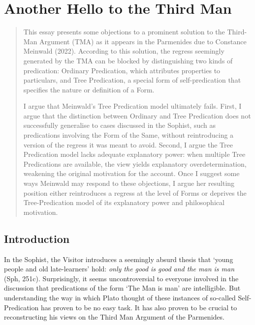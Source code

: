 \chapter{Another Hello to the Third Man}

\begin{quote}
    This essay presents some objections to a prominent solution to the Third-Man Argument (TMA) as it appears in the Parmenides due to Constance Meinwald (2022). According to this solution, the regress seemingly generated by the TMA can be blocked by distinguishing two kinds of predication: Ordinary Predication, which attributes properties to particulars, and Tree Predication, a special form of self-predication that specifies the nature or definition of a Form.

I argue that Meinwald’s Tree Predication model ultimately fails. First, I argue that the distinction between Ordinary and Tree Predication does not successfully generalise to cases discussed in the Sophist, such as predications involving the Form of the Same, without reintroducing a version of the regress it was meant to avoid. Second, I argue the Tree Predication model lacks adequate explanatory power: when multiple Tree Predications are available, the view yields explanatory overdetermination, weakening the original motivation for the account. Once I suggest some ways Meinwald may respond to these objections, I argue her resulting position either reintroduces a regress at the level of Forms or deprives the Tree-Predication model of its explanatory power and philosophical motivation. 
\end{quote}

\section{Introduction}
In the Sophist, the Visitor introduces a seemingly absurd thesis that `young people and old late-learners’ hold: \textit{only the good is good and the man is man} (Sph, 251c). Surprisingly, it seems uncontroversial to everyone involved in the discussion that predications of the form `The Man is man’ are intelligible. But understanding the way in which Plato thought of these instances of so-called Self-Predication has proven to be no easy task. It has also proven to be crucial to reconstructing his views on the Third Man Argument of the Parmenides. 

